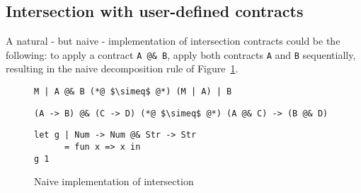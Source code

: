 \documentclass[sigplan,10pt,review,anonymous]{acmart}
\newcommand{\nickel}[1]{\lstinline[language=nickel]{#1}}
\begin{document}
%


\subsection{Intersection with user-defined contracts}
\label{sec:flat-and-inter}

A natural - but naive - implementation of intersection contracts could be the
following: to apply a contract \nickel{A @& B}, apply both contracts \nickel{A}
and \nickel{B} sequentially, resulting in the naive decomposition rule of
Figure~\ref{fig:naive-impl}.

\begin{figure}[h]
\begin{lstlisting}[language=nickel,frame=none,numbers=none,title={Naive
decomposition}]
M | A @& B (*@ $\simeq$ @*) (M | A) | B
\end{lstlisting}
\begin{lstlisting}[language=nickel,frame=none,numbers=none,title={Exchange law}]
(A -> B) @& (C -> D) (*@ $\simeq$ @*) (A @& C) -> (B @& D)
\end{lstlisting}
\begin{lstlisting}[language=nickel,title={Overloaded identity}]
let g | Num -> Num @& Str -> Str
      = fun x => x in
g 1
\end{lstlisting}
\caption{Naive implementation of intersection}
\label{fig:naive-impl}
\end{figure}
\end{document}
